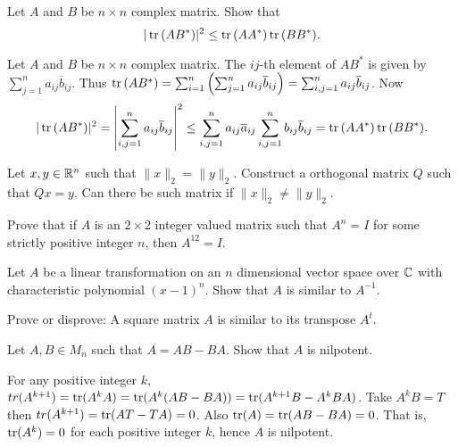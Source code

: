 \question Let $A$ and $B$ be $n\times n$ complex matrix. Show that $$|\operatorname{tr}{(AB^*)}|^2\leq\operatorname{tr}{(AA^*)}\operatorname{tr}{(BB^*)}.$$

\begin{solution}
    Let $A$ and $B$ be $n\times n$ complex matrix. The $ij$-th element of $AB^*$ is given by $\sum_{j=1}^{n}{a_{ij}\overline{b}_{ij}}$. Thus $\operatorname{tr}{(AB^*)}=\sum_{i=1}^{n}{\left(\sum_{j=1}^{n}{a_{ij}\overline{b}_{ij}}\right)}=\sum_{i,j=1}^{n}{a_{ij}\overline{b}_{ij}}$. Now
    $$|\operatorname{tr}{(AB^*)}|^2=\left|\sum_{i,j=1}^{n}{a_{ij}\overline{b}_{ij}}\right|^2\leq \sum_{i,j=1}^{n}{a_{ij}\overline{a}_{ij}}\sum_{i,j=1}^{n}{b_{ij}\overline{b}_{ij}}=\operatorname{tr}{(AA^*)}\operatorname{tr}{(BB^*)}.$$
\end{solution}

\question Let $x,y\in\mathbb{R}^n$ such that $\|x\|_2=\|y\|_2$. Construct a orthogonal matrix $Q$ such that $Qx=y$. Can there be such matrix if $\|x\|_2\neq\|y\|_2$.
\begin{solution}
    
\end{solution}

\question Prove that if $A$ is an $2\times 2$ integer valued matrix such that $A^n=I$ for some strictly positive integer $n$, then $A^{12}=I$.

\begin{solution}
    
\end{solution}

\question Let $A$ be a linear transformation on an $n$ dimensional vector space over $\mathbb{C}$ with characteristic polynomial $(x-1)^n$. Show that $A$ is similar to $A^{-1}$.

\begin{solution}
    
\end{solution}

\question Prove or disprove: A square matrix $A$ is similar to its transpose $A^t$.

\begin{solution}
    
\end{solution}

\question Let $A,B\in M_n$ such that $A=AB-BA$. Show that $A$ is nilpotent.

\begin{solution}
    For any positive integer $k$, $tr(A^{k+1})=\operatorname{tr}(A^kA)=\operatorname{tr}(A^k(AB-BA))=\operatorname{tr}(A^{k+1}B-A^kBA)$. Take $A^kB=T$ then $tr(A^{k+1})=\operatorname{tr}(AT-TA)=0$. Also $\operatorname{tr}(A)=\operatorname{tr}(AB-BA)=0$. That is, $\operatorname{tr}(A^k)=0$ for each positive integer $k$, hence $A$ is nilpotent.
\end{solution}

